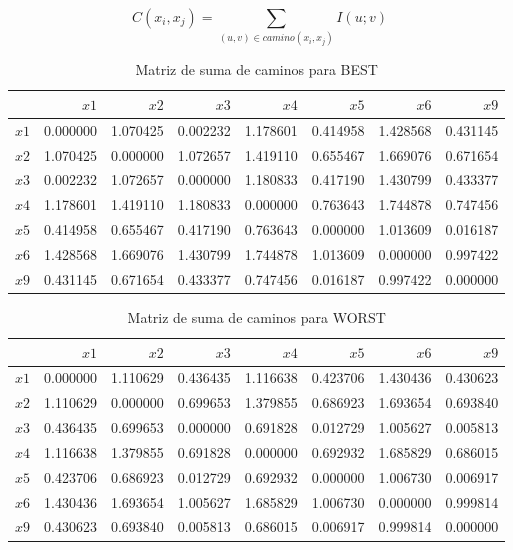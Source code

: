 \documentclass[12pt,a4paper]{article}
\newcommand{\formula}[1]{
\begin{cajaformula}
\centering
#1
\end{cajaformula}
}
\begin{document}
\formula{
\[
C(x_i,x_j)=\sum_{(u,v)\in camino(x_i,x_j)} I(u;v)
\]
}

\begin{table}[H]
\centering
\scriptsize
\caption{Matriz de suma de caminos para BEST}
\label{tab:matriz_caminos_best}
\begin{tabular}{lrrrrrrr}
\toprule
 & \(x1\) & \(x2\) & \(x3\) & \(x4\) & \(x5\) & \(x6\) & \(x9\) \\
\midrule
\(x1\) & 0.000000 & 1.070425 & 0.002232 & 1.178601 & 0.414958 & 1.428568 & 0.431145 \\
\(x2\) & 1.070425 & 0.000000 & 1.072657 & 1.419110 & 0.655467 & 1.669076 & 0.671654 \\
\(x3\) & 0.002232 & 1.072657 & 0.000000 & 1.180833 & 0.417190 & 1.430799 & 0.433377 \\
\(x4\) & 1.178601 & 1.419110 & 1.180833 & 0.000000 & 0.763643 & 1.744878 & 0.747456 \\
\(x5\) & 0.414958 & 0.655467 & 0.417190 & 0.763643 & 0.000000 & 1.013609 & 0.016187 \\
\(x6\) & 1.428568 & 1.669076 & 1.430799 & 1.744878 & 1.013609 & 0.000000 & 0.997422 \\
\(x9\) & 0.431145 & 0.671654 & 0.433377 & 0.747456 & 0.016187 & 0.997422 & 0.000000 \\
\bottomrule
\end{tabular}
\end{table}

\begin{table}[H]
\centering
\scriptsize
\caption{Matriz de suma de caminos para WORST}
\label{tab:matriz_caminos_worst}
\begin{tabular}{lrrrrrrr}
\toprule
 & \(x1\) & \(x2\) & \(x3\) & \(x4\) & \(x5\) & \(x6\) & \(x9\) \\
\midrule
\(x1\) & 0.000000 & 1.110629 & 0.436435 & 1.116638 & 0.423706 & 1.430436 & 0.430623 \\
\(x2\) & 1.110629 & 0.000000 & 0.699653 & 1.379855 & 0.686923 & 1.693654 & 0.693840 \\
\(x3\) & 0.436435 & 0.699653 & 0.000000 & 0.691828 & 0.012729 & 1.005627 & 0.005813 \\
\(x4\) & 1.116638 & 1.379855 & 0.691828 & 0.000000 & 0.692932 & 1.685829 & 0.686015 \\
\(x5\) & 0.423706 & 0.686923 & 0.012729 & 0.692932 & 0.000000 & 1.006730 & 0.006917 \\
\(x6\) & 1.430436 & 1.693654 & 1.005627 & 1.685829 & 1.006730 & 0.000000 & 0.999814 \\
\(x9\) & 0.430623 & 0.693840 & 0.005813 & 0.686015 & 0.006917 & 0.999814 & 0.000000 \\
\bottomrule
\end{tabular}
\end{table}
\end{document}
